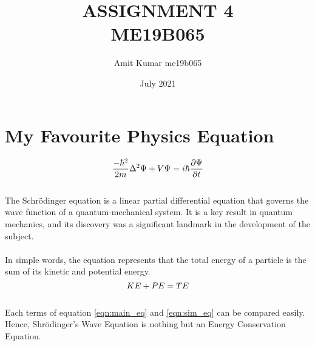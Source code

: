 \documentclass{article}
\title{%
ASSIGNMENT 4\\
ME19B065}
\author{Amit Kumar me19b065}
\date{July 2021}
\begin{document}
\maketitle

\section{My Favourite Physics Equation}
\hspace{6mm}
\begin{equation}
\label{eqn:main_eq}
\Large
      \frac{-\hbar^2}{2m}\Delta^2{\Psi} + V\Psi = i\hbar{\frac{\partial \Psi}{\partial t}}
\end{equation}
\\
The Schrödinger equation is a linear partial differential equation that governs the wave function of a quantum-mechanical system. It is a key result in quantum mechanics, and its discovery was a significant landmark in the development of the subject.
\\
\\
In simple words, the equation represents that the total energy of a particle is the sum of its kinetic and potential energy. \\
\begin{equation}
\label{eqn:sim_eq}
\Large
    KE+PE=TE
\end{equation}
\\
Each terms of equation \ref{eqn:main_eq} and \ref{eqn:sim_eq} can be compared easily. Hence, Shrödinger's Wave Equation is nothing but an Energy Conservation Equation.
\end{document}
